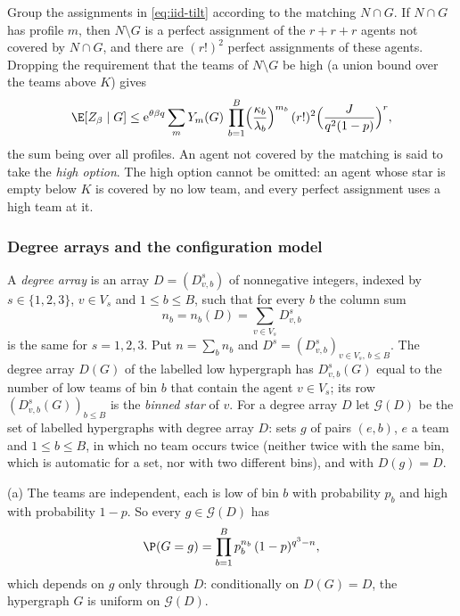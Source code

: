 Group the assignments in \eqref{eq:iid-tilt} according to the matching $N\cap G$. If
$N\cap G$ has profile $m$, then $N\setminus G$ is a perfect assignment of the $r+r+r$
agents not covered by $N\cap G$, and there are $(r!)^2$ perfect assignments of these
agents. Dropping the requirement that the teams of $N\setminus G$ be high (a union bound
over the teams above $K$) gives
\begin{equation}\label{eq:iid-cond}
\E[Z_\beta\mid G]\le\mathrm{e}^{\theta\beta q}\sum_{m}Y_m(G)\,
\prod_{b=1}^B\Bigl(\frac{\kappa_b}{\lambda_b}\Bigr)^{m_b}\,(r!)^2
\Bigl(\frac{J}{q^2(1-p)}\Bigr)^{r},
\end{equation}
the sum being over all profiles. An agent not covered by the matching is said to take the
\emph{high option}. The high option cannot be omitted: an agent whose star is empty below
$K$ is covered by no low team, and every perfect assignment uses a high team at it.

\subsubsection*{Degree arrays and the configuration model}
A \emph{degree array} is an array $D=(D^s_{v,b})$ of nonnegative integers, indexed by
$s\in\{1,2,3\}$, $v\in V_s$ and $1\le b\le B$, such that for every $b$ the column sum
\[
n_b=n_b(D)=\sum_{v\in V_s}D^s_{v,b}
\]
is the same for $s=1,2,3$. Put $n=\sum_bn_b$ and $D^s=(D^s_{v,b})_{v\in V_s,\,b\le B}$.
The degree array $D(G)$ of the labelled low hypergraph has $D^s_{v,b}(G)$ equal to the
number of low teams of bin $b$ that contain the agent $v\in V_s$; its row
$(D^s_{v,b}(G))_{b\le B}$ is the \emph{binned star} of $v$. For a degree array $D$ let
$\mathcal{G}(D)$ be the set of labelled hypergraphs with degree array $D$: sets $g$ of
pairs $(e,b)$, $e$ a team and $1\le b\le B$, in which no team occurs twice (neither twice
with the same bin, which is automatic for a set, nor with two different bins), and with
$D(g)=D$.

\smallskip\noindent(a) The teams are independent, each is low of bin $b$ with probability
$p_b$ and high with probability $1-p$. So every $g\in\mathcal{G}(D)$ has
\begin{equation}\label{eq:iid-uniform}
\P(G=g)=\prod_{b=1}^Bp_b^{n_b}\,(1-p)^{q^3-n},
\end{equation}
which depends on $g$ only through $D$: conditionally on $D(G)=D$, the hypergraph $G$ is
uniform on $\mathcal{G}(D)$.

